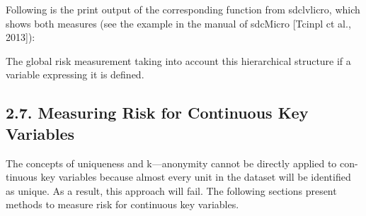 Following is the print
output of the corresponding function from sdclvlicro, which shows both measures
(see the example in the manual of sdcMicro [Tcinpl ct al., 2013]):


The global risk measurement taking into account this hierarchical structure if a
variable expressing it is defined.
%
%
%
%

\subsection*{2.7. Measuring Risk for Continuous Key Variables}
The concepts of uniqueness and k—anonymity cannot be directly applied to con-
tinuous key variables because almost every unit in the dataset will be identiﬁed as
unique. As a result, this approach will fail. The following sections present methods
to measure risk for continuous key variables.



